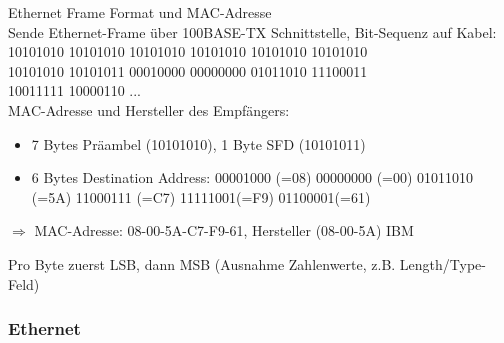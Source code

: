 \begin{example2}{Ethernet Frame Format und MAC-Adresse}\\
    Sende Ethernet-Frame über 100BASE-TX Schnittstelle, Bit-Sequenz auf Kabel:\\
    10101010 10101010 10101010 10101010 10101010 10101010\\
    10101010 10101011 00010000 00000000 01011010 11100011\\
    10011111 10000110 ...\\
    MAC-Adresse und Hersteller des Empfängers:
    \begin{itemize}
        \item 7 Bytes Präambel (10101010), 1 Byte SFD (10101011)
        \item 6 Bytes Destination Address: 00001000 (=08) 00000000 (=00) 01011010 (=5A) 11000111 (=C7) 11111001(=F9) 01100001(=61)
    \end{itemize}
    $\Rightarrow$ MAC-Adresse: 08-00-5A-C7-F9-61, Hersteller (08-00-5A) IBM
\end{example2}

\begin{remark}
    Pro Byte zuerst LSB, dann MSB (Ausnahme Zahlenwerte, z.B. Length/Type-Feld)
\end{remark}

\subsubsection*{Ethernet}

